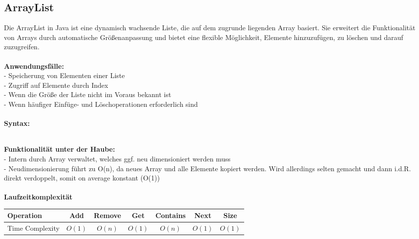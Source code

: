 \documentclass[../main.tex]{subfiles}
\begin{document}
		\subsection{ArrayList}
		Die ArrayList in Java ist eine dynamisch wachsende Liste, die auf dem zugrunde liegenden Array basiert.
		Sie erweitert die Funktionalität von Arrays durch automatische Größenanpassung und bietet eine flexible Möglichkeit, Elemente hinzuzufügen, zu löschen und darauf zuzugreifen. \\\\
		\textbf{Anwendungsfälle:}\\
		- Speicherung von Elementen einer Liste\\
		- Zugriff auf Elemente durch Index\\
		- Wenn die Größe der Liste nicht im Voraus bekannt ist\\ 
		- Wenn häufiger Einfüge- und Löschoperationen erforderlich sind\\\\
		\textbf{Syntax:}
		 
		\\
		\textbf{Funktionalität unter der Haube:}\\
		- Intern durch Array verwaltet, welches ggf. neu dimensioniert werden muss\\
		- Neudimensionierung führt zu O(n), da neues Array und alle Elemente kopiert werden. Wird allerdings selten gemacht und dann i.d.R. direkt verdoppelt, somit on average konstant (O(1))\\\\
		\textbf{Laufzeitkomplexität}\\
		\begin{table}[ht]
			\centering
			\begin{tabular}{l *{6}{c}}
				\toprule
				Operation & Add & Remove & Get & Contains & Next & Size \\
				\midrule
				Time Complexity & $O(1)$ & $O(n)$ & $O(1)$ & $O(n)$ & $O(1)$ & $O(1)$ \\
				\bottomrule
			\end{tabular}
		\end{table}
		\clearpage
		
		
\end{document}
